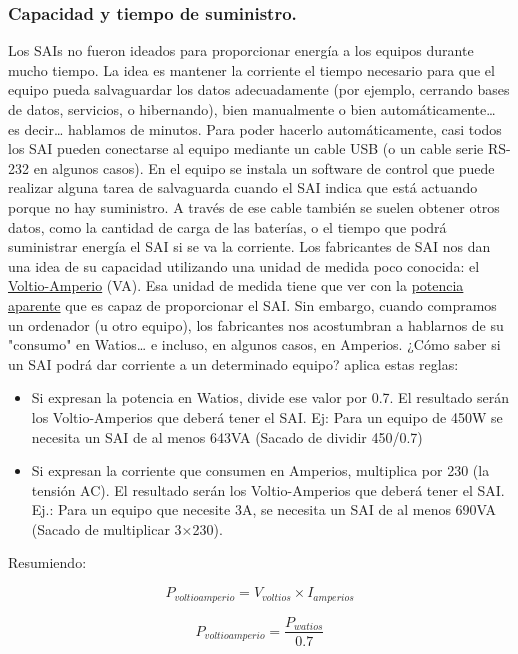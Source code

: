\documentclass[a4paper]{article}
\begin{document}
\subsubsection{Capacidad y tiempo de suministro.}
\label{sec:org0000084}
Los SAIs no fueron ideados para proporcionar energía a los equipos durante mucho tiempo. La idea es mantener la corriente el tiempo necesario para que el equipo pueda salvaguardar los datos adecuadamente (por ejemplo, cerrando bases de datos, servicios, o hibernando), bien manualmente o bien automáticamente\ldots{} es decir\ldots{} hablamos de minutos.
Para poder hacerlo automáticamente, casi todos los SAI pueden conectarse al equipo mediante un cable USB (o un cable serie RS-232 en algunos casos). En el equipo se instala un software de control que puede realizar alguna tarea de salvaguarda cuando el SAI indica que está actuando porque no hay suministro.
A través de ese cable también se suelen obtener otros datos, como la cantidad de carga de las baterías, o el tiempo que podrá suministrar energía el SAI si se va la corriente.
Los fabricantes de SAI nos dan una idea de su capacidad utilizando una unidad de medida poco conocida: el \href{http://es.wikipedia.org/wiki/Voltio-amperio}{Voltio-Amperio} (VA). Esa unidad de medida tiene que ver con la \href{http://es.wikipedia.org/wiki/Potencia\_aparente}{potencia aparente} que es capaz de proporcionar el SAI.
Sin embargo, cuando compramos un ordenador (u otro equipo), los fabricantes nos acostumbran a hablarnos de su "consumo" en Watios\ldots{} e incluso, en algunos casos, en Amperios. ¿Cómo saber si un SAI podrá dar corriente a un determinado equipo? aplica estas reglas:
\begin{itemize}
\item Si expresan la potencia en Watios, divide ese valor por 0.7. El resultado serán los Voltio-Amperios que deberá tener el SAI. Ej: Para un equipo de 450W se necesita un SAI de al menos 643VA (Sacado de dividir 450/0.7)
\item Si expresan la corriente que consumen en Amperios, multiplica por 230 (la tensión AC). El resultado serán los Voltio-Amperios que deberá tener el SAI. Ej.: Para un equipo que necesite 3A, se necesita un SAI de al menos 690VA (Sacado de multiplicar 3×230).
\end{itemize}

Resumiendo:

$$P_{voltioamperio} = V_{voltios} \times I_{amperios}$$

$$P_{voltioamperio} = \frac{P_{watios}}{0.7}$$
\end{document}
